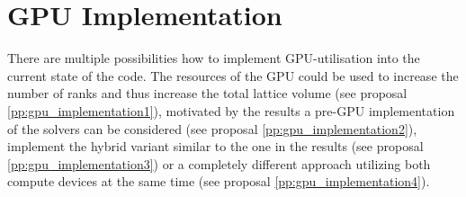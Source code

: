 \documentclass{article}
\theoremstyle{plain} %
\theoremstyle{convention} %
\theoremstyle{remark} %
\numberwithin{equation}{section}
\begin{document}
\section{GPU Implementation}

There are multiple possibilities how to implement GPU-utilisation into the current state of the code. The resources of the GPU could be used to increase the number of ranks and thus increase the total lattice volume (see proposal \ref{pp:gpu_implementation1}), motivated by the results a pre-GPU implementation of the solvers can be considered (see proposal \ref{pp:gpu_implementation2}), implement the hybrid variant similar to the one in the results (see proposal \ref{pp:gpu_implementation3}) or a completely different approach utilizing both compute devices at the same time (see proposal \ref{pp:gpu_implementation4}).
\end{document}
